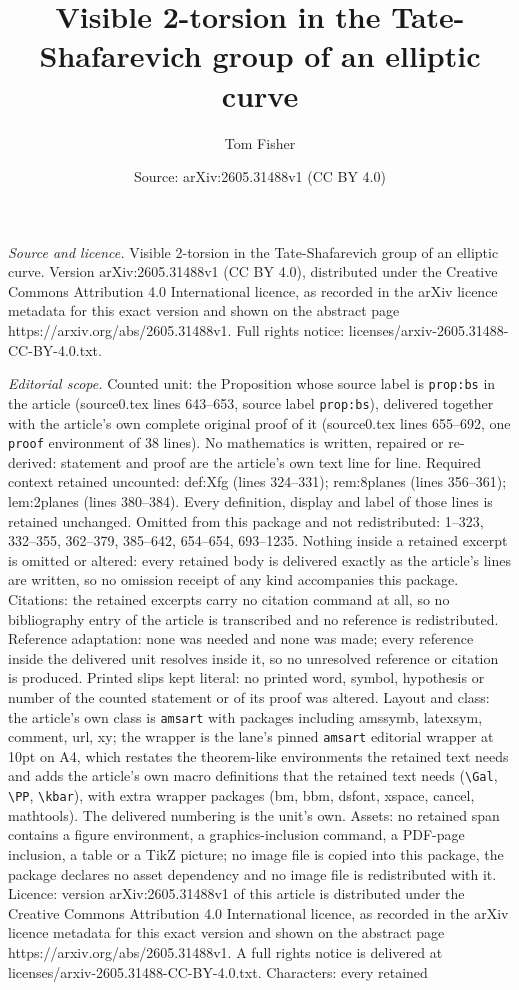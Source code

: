 \documentclass[10pt,a4paper]{amsart}
\title[Visible 2-torsion in the Tate-Shafarevich group of an ellipt]{Visible 2-torsion in the Tate-Shafarevich group of an elliptic curve}
\author{Tom Fisher}
\date{Source: arXiv:2605.31488v1 (CC BY 4.0)}
\begin{document}
\maketitle

\noindent\emph{Source and licence.} Visible 2-torsion in the Tate-Shafarevich group of an elliptic curve. Version arXiv:2605.31488v1 (CC BY 4.0), distributed under the Creative Commons Attribution 4.0 International licence, as recorded in the arXiv licence metadata for this exact version and shown on the abstract page https://arxiv.org/abs/2605.31488v1. Full rights notice: licenses/arxiv-2605.31488-CC-BY-4.0.txt.\par\smallskip

\noindent\textit{Editorial scope.} Counted unit: the Proposition whose source label is \texttt{prop:bs} in the article (source0.tex lines 643--653, source label \texttt{prop:bs}), delivered together with the article's own complete original proof of it (source0.tex lines 655--692, one \texttt{proof} environment of 38 lines). No mathematics is written, repaired or re-derived: statement and proof are the article's own text line for line. Required context retained uncounted: def:Xfg (lines 324--331); rem:8planes (lines 356--361); lem:2planes (lines 380--384). Every definition, display and label of those lines is retained unchanged. Omitted from this package and not redistributed: 1--323, 332--355, 362--379, 385--642, 654--654, 693--1235. Nothing inside a retained excerpt is omitted or altered: every retained body is delivered exactly as the article's lines are written, so no omission receipt of any kind accompanies this package. Citations: the retained excerpts carry no citation command at all, so no bibliography entry of the article is transcribed and no reference is redistributed. Reference adaptation: none was needed and none was made; every reference inside the delivered unit resolves inside it, so no unresolved reference or citation is produced. Printed slips kept literal: no printed word, symbol, hypothesis or number of the counted statement or of its proof was altered. Layout and class: the article's own class is \texttt{amsart} with packages including amssymb, latexsym, comment, url, xy; the wrapper is the lane's pinned \texttt{amsart} editorial wrapper at 10pt on A4, which restates the theorem-like environments the retained text needs and adds the article's own macro definitions that the retained text needs (\texttt{\textbackslash Gal}, \texttt{\textbackslash PP}, \texttt{\textbackslash kbar}), with extra wrapper packages (bm, bbm, dsfont, xspace, cancel, mathtools). The delivered numbering is the unit's own. Assets: no retained span contains a figure environment, a graphics-inclusion command, a PDF-page inclusion, a table or a TikZ picture; no image file is copied into this package, the package declares no asset dependency and no image file is redistributed with it. Licence: version arXiv:2605.31488v1 of this article is distributed under the Creative Commons Attribution 4.0 International licence, as recorded in the arXiv licence metadata for this exact version and shown on the abstract page https://arxiv.org/abs/2605.31488v1. A full rights notice is delivered at licenses/arxiv-2605.31488-CC-BY-4.0.txt. Characters: every retained 
\end{document}
